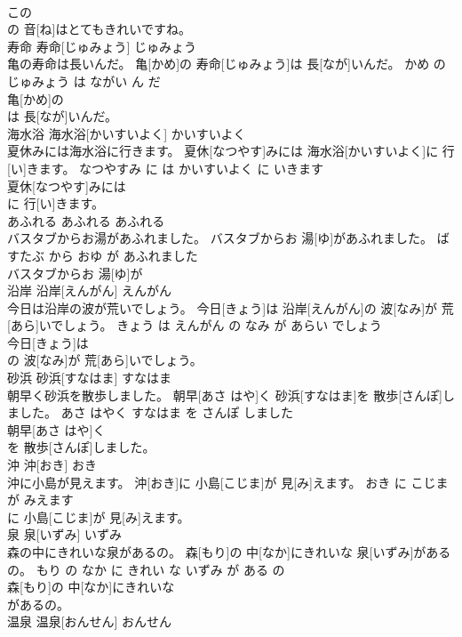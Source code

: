 \documentclass[8pt]{extreport}
\begin{document}
\begin{CJK}{UTF8}{min}
\\	この
\\	の 音[ね]はとてもきれいですね。			
\\	寿命	寿命[じゅみょう]	じゅみょう	
\\	亀の寿命は長いんだ。	亀[かめ]の 寿命[じゅみょう]は 長[なが]いんだ。	かめ の じゅみょう は ながい ん だ	
\\	亀[かめ]の
\\	は 長[なが]いんだ。			
\\	海水浴	海水浴[かいすいよく]	かいすいよく	
\\	夏休みには海水浴に行きます。	夏休[なつやす]みには 海水浴[かいすいよく]に 行[い]きます。	なつやすみ に は かいすいよく に いきます	
\\	夏休[なつやす]みには
\\	に 行[い]きます。			
\\	あふれる	あふれる	あふれる	
\\	バスタブからお湯があふれました。	バスタブからお 湯[ゆ]があふれました。	ばすたぶ から おゆ が あふれました	
\\	バスタブからお 湯[ゆ]が
\\	沿岸	沿岸[えんがん]	えんがん	
\\	今日は沿岸の波が荒いでしょう。	今日[きょう]は 沿岸[えんがん]の 波[なみ]が 荒[あら]いでしょう。	きょう は えんがん の なみ が あらい でしょう	
\\	今日[きょう]は
\\	の 波[なみ]が 荒[あら]いでしょう。			
\\	砂浜	砂浜[すなはま]	すなはま	
\\	朝早く砂浜を散歩しました。	朝早[あさ はや]く 砂浜[すなはま]を 散歩[さんぽ]しました。	あさ はやく すなはま を さんぽ しました	
\\	朝早[あさ はや]く
\\	を 散歩[さんぽ]しました。			
\\	沖	沖[おき]	おき	
\\	沖に小島が見えます。	沖[おき]に 小島[こじま]が 見[み]えます。	おき に こじま が みえます	
\\	に 小島[こじま]が 見[み]えます。			
\\	泉	泉[いずみ]	いずみ	
\\	森の中にきれいな泉があるの。	森[もり]の 中[なか]にきれいな 泉[いずみ]があるの。	もり の なか に きれい な いずみ が ある の	
\\	森[もり]の 中[なか]にきれいな
\\	があるの。			
\\	温泉	温泉[おんせん]	おんせん	

\end{CJK}
\end{document}
